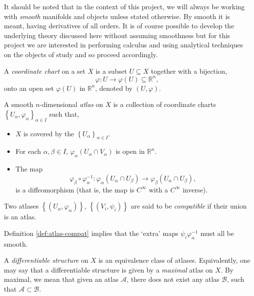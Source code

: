 It should be noted that in the context of this project, we will always be working with \textit{smooth} manifolds and objects unless stated otherwise. By smooth it is meant, having derivatives of all orders. It is of course possible to develop the underlying theory discussed here without assuming smoothness but for this project we are interested in performing calculus and using analytical techniques on the objects of study and so proceed accordingly.
\begin{definition}
A \textit{coordinate chart} on a set $X$ is a subset $U\subseteq X$ together with a bijection, $$\varphi :U\to\varphi(U)\subseteq\mathbb{R}^n,$$ onto an open set $\varphi(U)$ in $\mathbb{R}^n$, denoted by $(U,\varphi)$.
\end{definition}
\begin{definition}
A smooth $n$-dimensional \textit{atlas} on $X$ is a collection of coordinate charts $\left\{U_\alpha,\varphi_\alpha\right\}_{\alpha\in I}$ such that,
\begin{itemize}
\item $X$ is covered by the $\left\{U_\alpha\right\}_{\alpha\in I}$.
\item For each $\alpha,\beta\in I$, $\varphi_\alpha\left(U_\alpha\cap V_\alpha\right)$ is open in $\mathbb{R}^n$.
\item The map $$\varphi_\beta\circ\varphi_{\alpha}^{-1}:\varphi_\alpha\left(U_\alpha\cap U_\beta\right)\to\varphi_\beta\left(U_\alpha\cap U_\beta\right),$$ is a diffeomorphism (that is, the map is $C^{\infty}$ with a $C^{\infty}$ inverse).
\end{itemize}
\end{definition}
\begin{definition}
\label{def:atlas-compat}
Two atlases $\left\{\left(U_\alpha,\varphi_\alpha \right) \right\}$, $\left\{\left(V_i,\psi_i \right) \right\}$ are said to be \textit{compatible} if their union is an atlas.
\end{definition}
Definition \ref{def:atlas-compat} implies that the `extra' maps $\psi_i\varphi^{-1}_\alpha$ must all be smooth.
\begin{definition}
A \textit{differentiable structure} on $X$ is an equivalence class of atlases. Equivalently, one may say that a differentiable structure is given by a \textit{maximal} atlas on $X$. By maximal, we mean that given an atlas $\mathcal{A}$, there does not exist any atlas $\mathcal{B}$, such that $\mathcal{A}\subset \mathcal{B}$. 
\end{definition}

